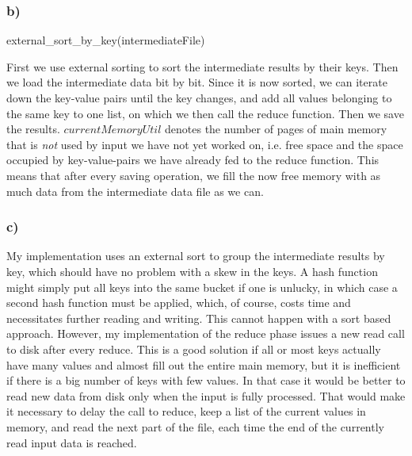 \documentclass[12pt,a4paper,fleqn]{article}
\begin{document}
\subsubsection*{b)}

\begin{algorithm}[H]
external\_sort\_by\_key(intermediateFile) \\


\end{algorithm}

First we use external sorting to sort the intermediate results by their keys. Then we load the intermediate data bit by bit. Since it is now sorted, we can iterate down the key-value pairs until the key changes, and add all values belonging to the same key to one list, on which we then call the reduce function. Then we save the results. $currentMemoryUtil$ denotes the number of pages of main memory that is \emph{not} used by input we have not yet worked on, i.e. free space and the space occupied by key-value-pairs we have already fed to the reduce function. This means that after every saving operation, we fill the now free memory with as much data from the intermediate data file as we can.

\subsubsection*{c)}
My implementation uses an external sort to group the intermediate results by key, which should have no problem with a skew in the keys. A hash function might simply put all keys into the same bucket if one is unlucky, in which case a second hash function must be applied, which, of course, costs time and necessitates further reading and writing. This cannot happen with a sort based approach. However, my implementation of the reduce phase issues a new read call to disk after every reduce. This is a good solution if all or most keys actually have many values and almost fill out the entire main memory, but it is inefficient if there is a big number of keys with few values. In that case it would be better to read new data from disk only when the input is fully processed. That would make it necessary to delay the call to reduce, keep a list of the current values in memory, and read the next part of the file, each time the end of the currently read input data is reached.
\end{document}
